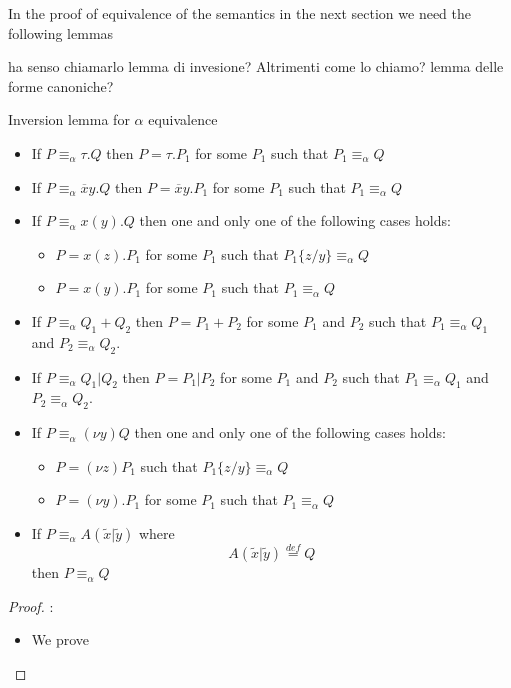 In the proof of equivalence of the semantics in the next section we need the following lemmas

ha senso chiamarlo lemma di invesione? Altrimenti come lo chiamo? lemma delle forme canoniche?

\begin{lemma}
  Inversion lemma for $\alpha$ equivalence
  \begin{itemize}
    \item
      If $P\equiv_{\alpha} \tau.Q$ then $P=\tau.P_{1}$ for some $P_{1}$ such that $P_{1}\equiv_{\alpha}Q$
    \item
      If $P\equiv_{\alpha} \overline{x}y.Q$ then $P=\overline{x}y.P_{1}$ for some $P_{1}$ such that $P_{1}\equiv_{\alpha}Q$
    \item
      If $P\equiv_{\alpha} x(y).Q$ then one and only one of the following cases holds:
      \begin{itemize}
	\item 
	  $P=x(z).P_{1}$ for some $P_{1}$ such that $P_{1}\{z/y\}\equiv_{\alpha}Q$
	\item
	  $P=x(y).P_{1}$ for some $P_{1}$ such that $P_{1}\equiv_{\alpha}Q$
      \end{itemize}
    \item
      If $P\equiv_{\alpha} Q_{1}+Q_{2}$ then $P=P_{1}+P_{2}$ for some $P_{1}$ and $P_{2}$ such that $P_{1}\equiv_{\alpha}Q_{1}$ and $P_{2}\equiv_{\alpha}Q_{2}$.
    \item 
      If $P\equiv_{\alpha} Q_{1}|Q_{2}$ then $P=P_{1}|P_{2}$ for some $P_{1}$ and $P_{2}$ such that $P_{1}\equiv_{\alpha}Q_{1}$ and $P_{2}\equiv_{\alpha}Q_{2}$.
    \item 
      If $P\equiv_{\alpha} (\nu y)Q$ then one and only one of the following cases holds:
      \begin{itemize}
	\item
	  $P=(\nu z)P_{1}$ such that $P_{1}\{z/y\}\equiv_{\alpha}Q$
	\item
	  $P=(\nu y).P_{1}$ for some $P_{1}$ such that $P_{1}\equiv_{\alpha}Q$
      \end{itemize}
    \item 
      If $P\equiv_{\alpha} A(\tilde{x}|\tilde{y})$ where 
      \[
	A(\tilde{x}|\tilde{y}) \stackrel{def}{=} Q
      \]
      then $P\equiv_{\alpha}Q$
  \end{itemize}
  \begin{proof}:
   \begin{itemize}
     \item
      We prove 

\end{itemize}
\end{proof}
\end{lemma}

